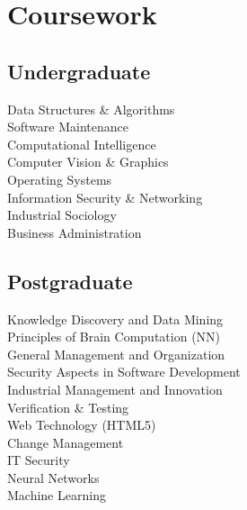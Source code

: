 \documentclass[]{resume}
\begin{document}


\vfill
\begin{minipage}[t]{0.33\textwidth} 
\section{Coursework}
	\subsection{Undergraduate}
		Data Structures \& Algorithms \\
		Software Maintenance \\
		Computational Intelligence\\
		Computer Vision \& Graphics \\
		Operating Systems \\
		Information Security \& Networking \\
		Industrial Sociology \\
		Business Administration
		\sectionsep
	
	\subsection{Postgraduate}
		Knowledge Discovery and Data Mining \\
		Principles of Brain Computation (NN) \\
		General Management and Organization \\
		Security Aspects in Software Development \\
		Industrial Management and Innovation \\
		Verification \& Testing \\
		Web Technology (HTML5) \\
		Change Management \\
		IT Security \\
		Neural Networks \\
		Machine Learning 
		\sectionsep	


\end{minipage}
\end{document}
